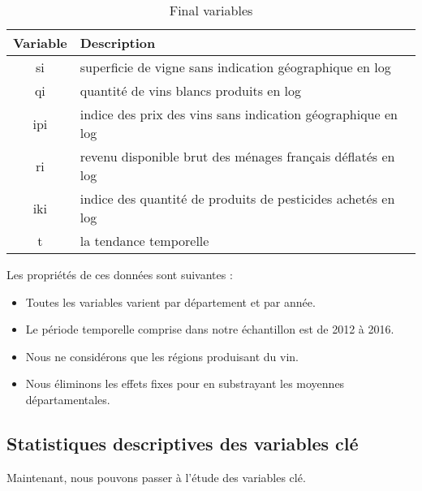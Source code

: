 \documentclass[11pt, a4paper]{article}
\begin{document}
\begin{table}[!htbp]
  \centering
  \begin{tabular}{c|l}
    \hline
    Variable & Description \\
    \hline
  si & superficie de vigne sans indication géographique en log \\
  qi & quantité de vins blancs produits en log \\
  ipi & indice des prix des vins sans indication géographique en log \\
  ri & revenu disponible brut des ménages français déflatés en log \\
  iki & indice des quantité de produits de pesticides achetés en log \\
  t & la tendance temporelle \\
  \hline
  \end{tabular}  
\caption{Final variables}
\end{table}
\FloatBarrier
Les propriétés de ces données sont suivantes :
\begin{itemize}
  \item Toutes les variables varient par département et par année.
  \item Le période temporelle comprise dans notre échantillon est de 2012 à 2016.
  \item Nous ne considérons que les régions produisant du vin. 
  \item Nous éliminons les effets fixes pour en substrayant les moyennes départamentales.
\end{itemize}

\subsection{Statistiques descriptives des variables clé}
Maintenant, nous pouvons passer à l'étude des variables clé.
\end{document}
